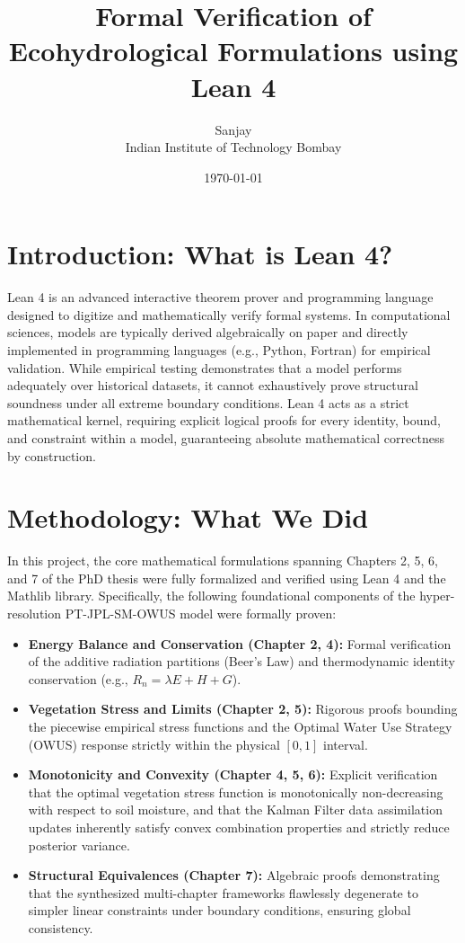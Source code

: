 \documentclass[11pt,a4paper]{article}
\title{\textbf{Formal Verification of Ecohydrological Formulations using Lean 4}}
\author{Sanjay \\ Indian Institute of Technology Bombay}
\date{\today}
\begin{document}
\maketitle
\thispagestyle{empty}

\section{Introduction: What is Lean 4?}
Lean 4 is an advanced interactive theorem prover and programming language designed to digitize and mathematically verify formal systems. In computational sciences, models are typically derived algebraically on paper and directly implemented in programming languages (e.g., Python, Fortran) for empirical validation. While empirical testing demonstrates that a model performs adequately over historical datasets, it cannot exhaustively prove structural soundness under all extreme boundary conditions. Lean 4 acts as a strict mathematical kernel, requiring explicit logical proofs for every identity, bound, and constraint within a model, guaranteeing absolute mathematical correctness by construction.

\section{Methodology: What We Did}
In this project, the core mathematical formulations spanning Chapters 2, 5, 6, and 7 of the PhD thesis were fully formalized and verified using Lean 4 and the Mathlib library. Specifically, the following foundational components of the hyper-resolution PT-JPL-SM-OWUS model were formally proven:
\begin{itemize}[itemsep=4pt, parsep=0pt, topsep=4pt]
    \item \textbf{Energy Balance and Conservation (Chapter 2, 4):} Formal verification of the additive radiation partitions (Beer's Law) and thermodynamic identity conservation (e.g., $R_n = \lambda E + H + G$).
    \item \textbf{Vegetation Stress and Limits (Chapter 2, 5):} Rigorous proofs bounding the piecewise empirical stress functions and the Optimal Water Use Strategy (OWUS) response strictly within the physical $[0, 1]$ interval.
    \item \textbf{Monotonicity and Convexity (Chapter 4, 5, 6):} Explicit verification that the optimal vegetation stress function is monotonically non-decreasing with respect to soil moisture, and that the Kalman Filter data assimilation updates inherently satisfy convex combination properties and strictly reduce posterior variance.
    \item \textbf{Structural Equivalences (Chapter 7):} Algebraic proofs demonstrating that the synthesized multi-chapter frameworks flawlessly degenerate to simpler linear constraints under boundary conditions, ensuring global consistency.
\end{itemize}
\end{document}
